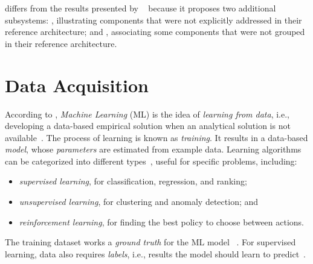  differs from the results presented
by \citeauthor{Kumara2023ArchitectingPractice}%
~\parencite{Kumara2023ArchitectingPractice} because it proposes
two additional subsystems:
  ,
  illustrating components that were not explicitly addressed
  in their reference architecture; and
  ,
  associating some components that were not grouped in
  their reference architecture.

  \section{Data Acquisition}
  \label{sec:ref_data_acquisition}

  According to \citeauthor{Abu-Mostafa2012LearningData},
  \emph{Machine Learning} (ML) is the idea of \emph{learning from data},
  i.e., developing a data-based empirical solution when an analytical
  solution is not available~\parencite{Abu-Mostafa2012LearningData}.
  The process of learning is known as \emph{training}. It results in
  a data-based \emph{model}, whose \emph{parameters} are estimated from
  example data. Learning algorithms can be categorized into different
  types~\parencite{RussellS2021Artificial4th}, useful for specific problems,
  including:
  \begin{itemize}
      \item \emph{supervised learning}, for classification, regression,
            and ranking;
      \item \emph{unsupervised learning}, for clustering and anomaly
            detection; and
      \item \emph{reinforcement learning}, for finding the best policy
            to choose between actions.
  \end{itemize}
  The training dataset works a \emph{ground truth} for the ML model%
  ~\parencite{Burkov2020MachineEngineering}. For supervised learning,
  data also requires \emph{labels}, i.e., results the model should learn
  to predict~\parencite{RussellS2021Artificial4th}.

